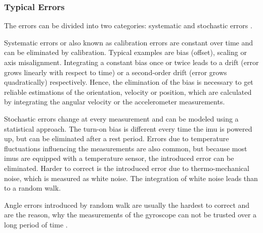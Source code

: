 \subsubsection{Typical  Errors}
\label{sse:mems_errors}
The errors can be divided into two categories: systematic and stochastic errors \cite{Zhang2019}.\par
Systematic errors or also known as calibration errors are constant over time and can be eliminated by calibration.
Typical examples are bias (offset), scaling or axis misalignment.
Integrating a constant bias once or twice leads to a drift (error grows linearly with respect to time) or a second-order drift (error grows quadratically) respectively.
Hence, the elimination of the bias is necessary to get reliable estimations of the orientation, velocity or position, which are calculated by integrating the angular velocity or the accelerometer measurements.\par
Stochastic errors change at every measurement and can be modeled using a statistical approach.
The turn-on bias is different every time the \gls{imu} is powered up, but can be eliminated after a rest period.
Errors due to temperature fluctuations influencing the measurements are also common, but because most \glspl{imu} are equipped with a temperature sensor, the introduced error can be eliminated.
Harder to correct is the introduced error due to thermo-mechanical noise, which is measured as white noise.
The integration of white noise leads than to a random walk.\par
Angle errors introduced by random walk are usually the hardest to correct and are the reason, why the measurements of the gyroscope can not be trusted over a long period of time \cite{Woodman2007}.


